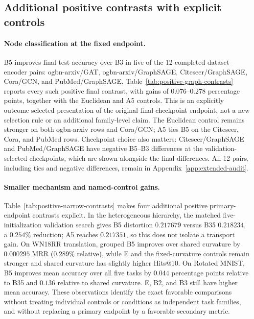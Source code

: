 \subsection{Additional positive contrasts with explicit controls}
\label{sec:additional-positive}
\paragraph{Node classification at the fixed endpoint.}
B5 improves final test accuracy over B3 in five of the 12 completed dataset--encoder pairs: ogbn-arxiv/GAT, ogbn-arxiv/GraphSAGE, Citeseer/GraphSAGE, Cora/GCN, and PubMed/GraphSAGE. Table~\ref{tab:positive-graph-contrasts} reports every such positive final contrast, with gains of $0.076$--$0.278$ percentage points, together with the Euclidean and A5 controls. This is an explicitly outcome-selected presentation of the original final-checkpoint endpoint, not a new selection rule or an additional family-level claim. The Euclidean control remains stronger on both ogbn-arxiv rows and Cora/GCN; A5 ties B5 on the Citeseer, Cora, and PubMed rows. Checkpoint choice also matters: Citeseer/GraphSAGE and PubMed/GraphSAGE have negative B5--B3 differences at the validation-selected checkpoints, which are shown alongside the final differences. All 12 pairs, including ties and negative differences, remain in Appendix~\ref{app:extended-audit}.



\paragraph{Smaller mechanism and named-control gains.}
Table~\ref{tab:positive-narrow-contrasts} makes four additional positive primary-endpoint contrasts explicit. In the heterogeneous hierarchy, the matched five-initialization validation search gives B5 distortion $0.217679$ versus B35 $0.218234$, a $0.254\%$ reduction; A5 reaches $0.217351$, so this does not isolate a transport gain. On WN18RR translation, grouped B5 improves over shared curvature by $0.000295$ MRR ($0.289\%$ relative), while E and the fixed-curvature controls remain stronger and shared curvature has slightly higher Hits@10. On Rotated MNIST, B5 improves mean accuracy over all five tasks by $0.044$ percentage points relative to B35 and $0.136$ relative to shared curvature. E, B2, and B3 still have higher mean accuracy. These observations identify the exact favorable comparisons without treating individual controls or conditions as independent task families, and without replacing a primary endpoint by a favorable secondary metric.

